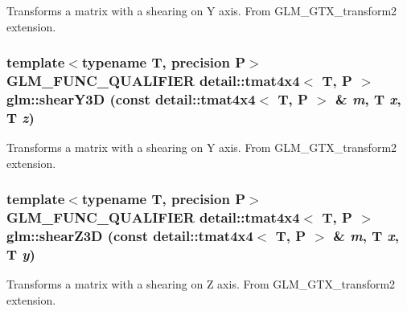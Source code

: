 Transforms a matrix with a shearing on Y axis. From GLM\_\-GTX\_\-transform2 extension. \hypertarget{group__gtx__transform2_g9f9bb8a5e641eb978f4ed24e980bd898}{
\subsubsection[shearY3D]{\setlength{\rightskip}{0pt plus 5cm}template$<$typename T, precision P$>$ GLM\_\-FUNC\_\-QUALIFIER detail::tmat4x4$<$ T, P $>$ glm::shearY3D (const detail::tmat4x4$<$ T, P $>$ \& {\em m}, \/  T {\em x}, \/  T {\em z})}}
\label{group__gtx__transform2_g9f9bb8a5e641eb978f4ed24e980bd898}


Transforms a matrix with a shearing on Y axis. From GLM\_\-GTX\_\-transform2 extension. \hypertarget{group__gtx__transform2_ge94300dc2220af5a0d4afa13c912d1a1}{
\subsubsection[shearZ3D]{\setlength{\rightskip}{0pt plus 5cm}template$<$typename T, precision P$>$ GLM\_\-FUNC\_\-QUALIFIER detail::tmat4x4$<$ T, P $>$ glm::shearZ3D (const detail::tmat4x4$<$ T, P $>$ \& {\em m}, \/  T {\em x}, \/  T {\em y})}}
\label{group__gtx__transform2_ge94300dc2220af5a0d4afa13c912d1a1}


Transforms a matrix with a shearing on Z axis. From GLM\_\-GTX\_\-transform2 extension. 